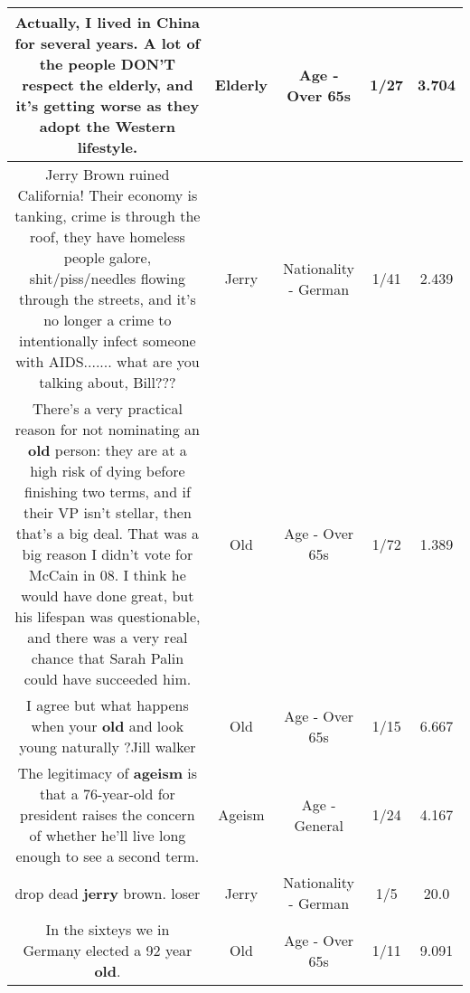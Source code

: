 \documentclass[11pt]{article}
\newlength\mylength
\begin{document}
\begin{center}
\begin{longtable}{|C{.65\mylength}|C{.30\mylength}|C{.12\mylength}|C{.12\mylength}|C{.12\mylength}|}
  \small Actually, I lived in China for several years. A lot of the people DON'T respect the \textbf{elderly}, and it's getting worse as they adopt the Western lifestyle.\normalsize   & Elderly & Age - Over 65s & 1/27 & 3.704 \\  \hline
  \small Jerry Brown ruined California! Their economy is tanking, crime is through the roof, they have homeless people galore, shit/piss/needles flowing through the streets, and it's no longer a crime to intentionally infect someone with AIDS....... what are you talking about, Bill???\normalsize   & Jerry & Nationality - German & 1/41 & 2.439 \\  \hline
  \small There's a very practical reason for not nominating an \textbf{old} person: they are at a high risk of dying before finishing two terms, and if their VP isn't stellar, then that's a big deal. That was a big reason I didn't vote for McCain in 08. I think he would have done great, but his lifespan was questionable, and there was a very real chance that Sarah Palin could have succeeded him.\normalsize   & Old & Age - Over 65s & 1/72 & 1.389 \\  \hline
  \small I agree but what happens when your \textbf{old} and look young naturally ?Jill walker\normalsize   & Old & Age - Over 65s & 1/15 & 6.667 \\  \hline
  \small The legitimacy of \textbf{ageism} is that a 76-year-old for president raises the concern of whether he'll live long enough to see a second term.\normalsize   & Ageism & Age - General & 1/24 & 4.167 \\  \hline
  \small drop dead \textbf{jerry} brown. loser\normalsize   & Jerry & Nationality - German & 1/5 & 20.0 \\  \hline
  \small In the sixteys we in Germany elected a 92 year \textbf{old}.\normalsize   & Old & Age - Over 65s & 1/11 & 9.091 \\  \hline

\end{longtable}
\end{center}
\end{document}
